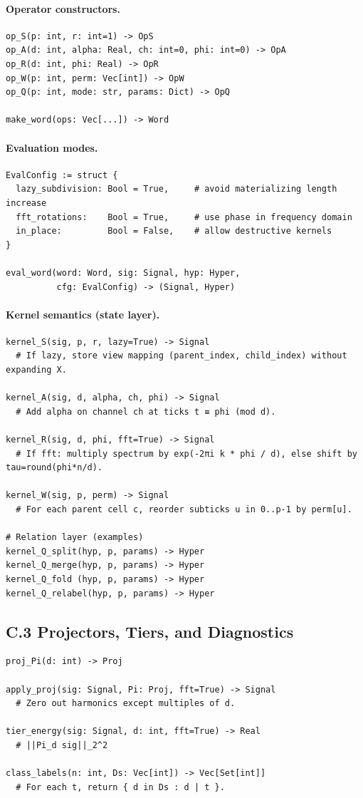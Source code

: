 \documentclass[12pt]{article}
\numberwithin{equation}{section}
\theoremstyle{plain}
\theoremstyle{definition}
\theoremstyle{remark}
\begin{document}
\paragraph{Operator constructors.}
\begin{verbatim}
op_S(p: int, r: int=1) -> OpS
op_A(d: int, alpha: Real, ch: int=0, phi: int=0) -> OpA
op_R(d: int, phi: Real) -> OpR
op_W(p: int, perm: Vec[int]) -> OpW
op_Q(p: int, mode: str, params: Dict) -> OpQ

make_word(ops: Vec[...]) -> Word
\end{verbatim}

\paragraph{Evaluation modes.}
\begin{verbatim}
EvalConfig := struct {
  lazy_subdivision: Bool = True,     # avoid materializing length increase
  fft_rotations:    Bool = True,     # use phase in frequency domain
  in_place:         Bool = False,    # allow destructive kernels
}

eval_word(word: Word, sig: Signal, hyp: Hyper,
          cfg: EvalConfig) -> (Signal, Hyper)
\end{verbatim}

\paragraph{Kernel semantics (state layer).}
\begin{verbatim}
kernel_S(sig, p, r, lazy=True) -> Signal
  # If lazy, store view mapping (parent_index, child_index) without expanding X.

kernel_A(sig, d, alpha, ch, phi) -> Signal
  # Add alpha on channel ch at ticks t ≡ phi (mod d).

kernel_R(sig, d, phi, fft=True) -> Signal
  # If fft: multiply spectrum by exp(-2πi k * phi / d), else shift by tau=round(phi*n/d).

kernel_W(sig, p, perm) -> Signal
  # For each parent cell c, reorder subticks u in 0..p-1 by perm[u].

# Relation layer (examples)
kernel_Q_split(hyp, p, params) -> Hyper
kernel_Q_merge(hyp, p, params) -> Hyper
kernel_Q_fold (hyp, p, params) -> Hyper
kernel_Q_relabel(hyp, p, params) -> Hyper
\end{verbatim}

\subsection*{C.3 Projectors, Tiers, and Diagnostics}
\begin{verbatim}
proj_Pi(d: int) -> Proj

apply_proj(sig: Signal, Pi: Proj, fft=True) -> Signal
  # Zero out harmonics except multiples of d.

tier_energy(sig: Signal, d: int, fft=True) -> Real
  # ||Pi_d sig||_2^2

class_labels(n: int, Ds: Vec[int]) -> Vec[Set[int]]
  # For each t, return { d in Ds : d | t }.
\end{verbatim}
\end{document}
